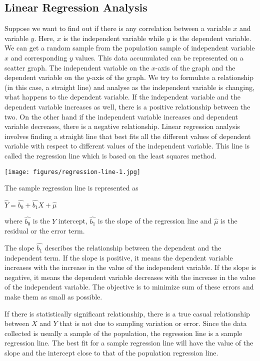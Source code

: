 \documentclass[a4paper]{aitthesis}
\begin{document}
\subsection{Linear Regression Analysis}
Suppose we want to find out if there is any correlation between a variable $x$ and variable $y$. Here, $x$ is the independent variable while $y$ is the dependent variable. We can get a random sample from the population sample of independent variable $x$ and corresponding $y$ values. This data accumulated can be represented on a scatter graph. The independent variable on the $x$-axis of the graph and the dependent variable on the $y$-axis of the graph.
We try to formulate a relationship (in this case, a straight line) and analyse as the independent variable is changing, what happens to the dependent variable. If the independent variable and the dependent variable increases as well, there is a positive relationship between the two. On the other hand if the independent variable increases and dependent variable decreases, there is a negative relationship. Linear regression analysis involves finding a straight line that best fits all the different values of dependent variable with respect to different values of the independent variable. This line is called the regression line which is based on the least squares method. 
\begin{center}
\texttt{[image: figures/regression-line-1.jpg]}%
\end{center}

The sample regression line is represented as  \newline
\begin{center}
\large $\hat{Y} = \hat{b_0} + \hat{b_1}X + \hat{\mu}$
\end{center}
 where $\hat{b_0}$ is the $Y$ intercept, $\hat{b_1}$ is the slope of the regression line and $\hat{\mu}$ is the residual or the error term.
 
The slope $\hat{b_1}$ describes the relationship between the dependent and the independent term. If the slope is positive, it means the dependent variable increases with the increase in the value of  the independent variable. If the slope is negative, it means the dependent variable decreases with the increase in the value of the independent variable. The objective is to minimize sum of these errors and make them as small as possible.
 
 If there is statistically significant relationship, there is a true casual relationship between $X$ and $Y$ that is not  due to sampling variation or error. Since the data collected is usually a sample of the population, the regression line is a sample regression line. The best fit for a sample regression line will have the value of the slope and the intercept close to that of the population regression line.
 
\end{document}
